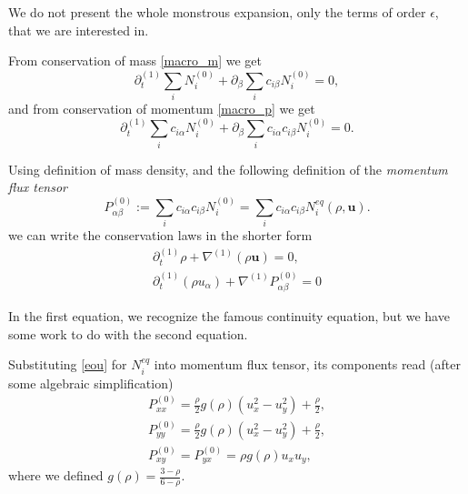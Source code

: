 We do not present the whole monstrous expansion, only the terms of order $\epsilon$, that we are interested in.

From conservation of mass \ref{macro_m} we get
\begin{equation}
\partial_t^{(1)} \sum_i N_i^{(0)} + \partial_{\beta} \sum_i c_{i\beta} N_i^{(0)} = 0,
\end{equation}
and from conservation of momentum \ref{macro_p} we get
\begin{equation}
\partial_t^{(1)} \sum_i c_{i\alpha} N_i^{(0)} + \partial_{\beta} \sum_i c_{i\alpha} c_{i\beta} N_i^{(0)} = 0.
\end{equation}

Using definition of mass density, and the following definition of the \textit{momentum flux tensor}
\begin{equation}
P^{(0)}_{\alpha\beta} := \sum_i c_{i\alpha} c_{i\beta} N_i^{(0)} = \sum_i c_{i\alpha} c_{i\beta} N_i^{eq}(\rho, \bm{u}).
\end{equation}
we can write the conservation laws in the shorter form
\begin{equation} 
\begin{split}
\partial_t^{(1)} \rho + \nabla^{(1)}(\rho \bm{u}) = 0, \\ 
\partial_t^{(1)} (\rho u_{\alpha}) + \nabla^{(1)} P^{(0)}_{\alpha\beta} = 0 \label{eul_primitive}
\end{split}
\end{equation}

In the first equation, we recognize the famous continuity equation, but we have some work to do with the second equation.

Substituting \ref{eou} for $N_i^{eq}$ into momentum flux tensor, its components read (after some algebraic simplification)
\begin{equation} \label{FHPT}
\begin{split}
P_{xx}^{(0)} = \frac{\rho}{2}g(\rho)(u_x^2 - u_y^2) + \frac{\rho}{2},\\
P_{yy}^{(0)} = \frac{\rho}{2}g(\rho) (u_x^2 - u_y^2) + \frac{\rho}{2},\\
P_{xy}^{(0)} = P_{yx}^{(0)} = \rho g(\rho)u_xu_y,
\end{split}
\end{equation}
where we defined $g(\rho) =  \frac{3-\rho}{6 - \rho}$.

